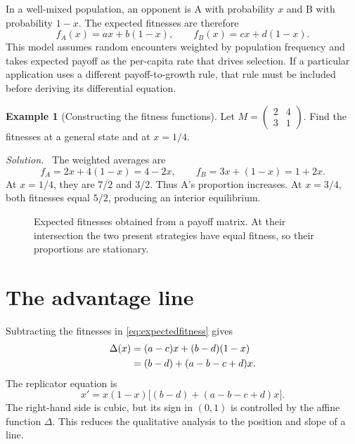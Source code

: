 \documentclass[11pt,oneside,openany]{book}
\theoremstyle{definition}
\newtheorem{example}{Example}[chapter]
\theoremstyle{remark}
\newenvironment{solution}{\par\smallskip\noindent\textit{Solution.}\ }{\par\smallskip}
\numberwithin{equation}{chapter}
\begin{document}
In a well-mixed population, an opponent is A with probability $x$ and B with probability $1-x$. The expected fitnesses are therefore
\begin{equation}\label{eq:expectedfitness}
f_A(x)=ax+b(1-x),\qquad f_B(x)=cx+d(1-x).
\end{equation}
This model assumes random encounters weighted by population frequency and takes expected payoff as the per-capita rate that drives selection. If a particular application uses a different payoff-to-growth rule, that rule must be included before deriving its differential equation.

\begin{example}[Constructing the fitness functions]
Let $M=\left(\begin{smallmatrix}2&4\\3&1\end{smallmatrix}\right)$. Find the fitnesses at a general state and at $x=1/4$.
\begin{solution}
The weighted averages are
\[
f_A=2x+4(1-x)=4-2x,\qquad f_B=3x+(1-x)=1+2x.
\]
At $x=1/4$, they are $7/2$ and $3/2$. Thus A's proportion increases. At $x=3/4$, both fitnesses equal $5/2$, producing an interior equilibrium.
\end{solution}
\end{example}

\begin{figure}[htbp]
\centering
{}
\caption{Expected fitnesses obtained from a payoff matrix. At their intersection the two present strategies have equal fitness, so their proportions are stationary.}
\end{figure}

\section{The advantage line}
Subtracting the fitnesses in \eqref{eq:expectedfitness} gives
\begin{align}
\Delta(x)&=(a-c)x+(b-d)(1-x)\notag\\
&=(b-d)+(a-b-c+d)x.\label{eq:advantageline}
\end{align}
The replicator equation is
\begin{equation}\label{eq:matrixrep}
x'=x(1-x)\bigl[(b-d)+(a-b-c+d)x\bigr].
\end{equation}
The right-hand side is cubic, but its sign in $(0,1)$ is controlled by the affine function $\Delta$. This reduces the qualitative analysis to the position and slope of a line.
\end{document}
